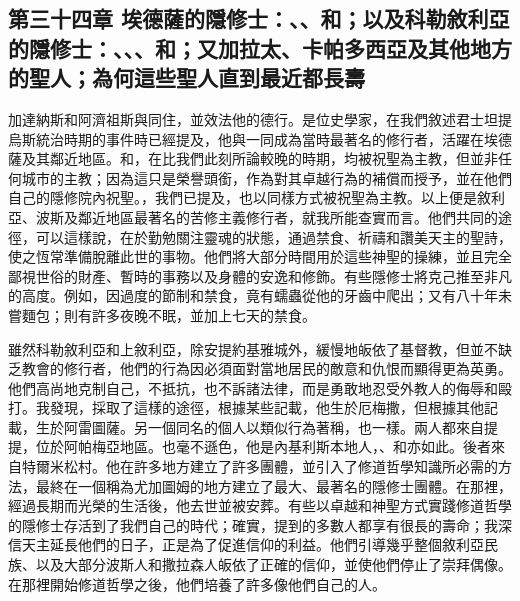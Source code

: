 
\subsection{第三十四章 埃德薩的隱修士：、、和；以及科勒敘利亞的隱修士：、、、和；又加拉太、卡帕多西亞及其他地方的聖人；為何這些聖人直到最近都長壽}

加達納斯和阿濟祖斯與同住，並效法他的德行。是位史學家，在我們敘述君士坦提烏斯統治時期的事件時已經提及，他與一同成為當時最著名的修行者，活躍在埃德薩及其鄰近地區。和，在比我們此刻所論較晚的時期，均被祝聖為主教，但並非任何城市的主教；因為這只是榮譽頭銜，作為對其卓越行為的補償而授予，並在他們自己的隱修院內祝聖。，我們已提及，也以同樣方式被祝聖為主教。以上便是敘利亞、波斯及鄰近地區最著名的苦修主義修行者，就我所能查實而言。他們共同的途徑，可以這樣說，在於勤勉關注靈魂的狀態，通過禁食、祈禱和讚美天主的聖詩，使之恆常準備脫離此世的事物。他們將大部分時間用於這些神聖的操練，並且完全鄙視世俗的財產、暫時的事務以及身體的安逸和修飾。有些隱修士將克己推至非凡的高度。例如，因過度的節制和禁食，竟有蠕蟲從他的牙齒中爬出；又有八十年未嘗麵包；則有許多夜晚不眠，並加上七天的禁食。\par

雖然科勒敘利亞和上敘利亞，除安提約基雅城外，緩慢地皈依了基督教，但並不缺乏教會的修行者，他們的行為因必須面對當地居民的敵意和仇恨而顯得更為英勇。他們高尚地克制自己，不抵抗，也不訴諸法律，而是勇敢地忍受外教人的侮辱和毆打。我發現，採取了這樣的途徑，根據某些記載，他生於厄梅撒，但根據其他記載，生於阿雷圖薩。另一個同名的個人以類似行為著稱，也一樣。兩人都來自提提，位於阿帕梅亞地區。也毫不遜色，他是內基利斯本地人，、和亦如此。後者來自特爾米松村。他在許多地方建立了許多團體，並引入了修道哲學知識所必需的方法，最終在一個稱為尤加圖姆的地方建立了最大、最著名的隱修士團體。在那裡，經過長期而光榮的生活後，他去世並被安葬。有些以卓越和神聖方式實踐修道哲學的隱修士存活到了我們自己的時代；確實，提到的多數人都享有很長的壽命；我深信天主延長他們的日子，正是為了促進信仰的利益。他們引導幾乎整個敘利亞民族、以及大部分波斯人和撒拉森人皈依了正確的信仰，並使他們停止了崇拜偶像。在那裡開始修道哲學之後，他們培養了許多像他們自己的人。\par

